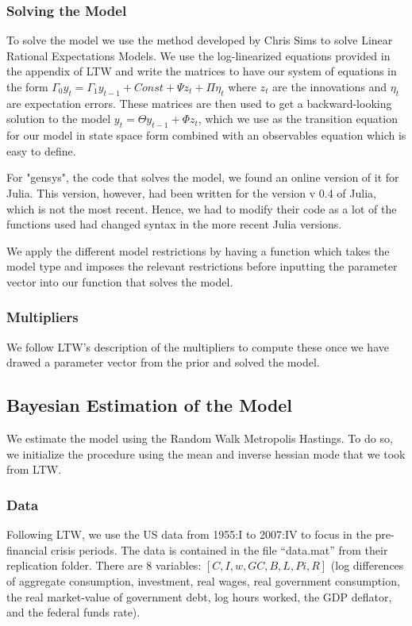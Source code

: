 \documentclass[letterpaper,12pt]{article}%
\begin{document}
\subsubsection*{Solving the Model}
To solve the model we use the method developed by Chris Sims to solve Linear Rational Expectations Models. We use the log-linearized equations provided in the appendix of LTW and write the matrices to have our system of equations in the form $\Gamma_0 y_{t}=\Gamma_1 y_{t-1}+Const+\Psi z_t+\Pi \eta_t$ where $z_t$ are the innovations and $\eta_t$ are expectation errors. These matrices are then used to get a backward-looking solution to the model $y_t=\Theta y_{t-1}+ \Phi z_t$, which we use as the transition equation for our model in state space form combined with an observables equation which is easy to define. 

For "gensys", the code that solves the model, we found an online version of it for Julia. This version, however, had been written for the version v 0.4 of Julia, which is not the most recent. Hence, we had to modify their code as a lot of the functions used had changed syntax in the more recent Julia versions.

We apply the different model restrictions by having a function which takes the model type and imposes the relevant restrictions before inputting the parameter vector into our function that solves the model.

\subsubsection{Multipliers}
We follow LTW's description of the multipliers to compute these once we have drawed a parameter vector from the prior and solved the model.

\subsection{Bayesian Estimation of the Model}
We estimate the model using the Random Walk Metropolis Hastings. To do so, we initialize the procedure using the mean and inverse hessian mode that we took from LTW.

\subsubsection*{Data}
Following LTW, we use the US data from 1955:I to 2007:IV to focus in the pre-financial crisis periods. The data is contained in the file ``data.mat'' from their replication folder. There are 8 variables: $[C, I, w, GC, B, L, Pi, R]$ (log differences of aggregate consumption, investment, real wages, real government consumption, the real market-value of government debt, log hours worked, the GDP deflator, and the federal funds rate).
\end{document}
